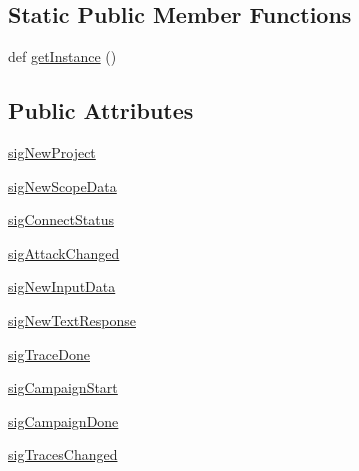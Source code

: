 \subsection*{Static Public Member Functions}
\begin{DoxyCompactItemize}
\item 
def \hyperlink{classsoftware_1_1chipwhisperer_1_1common_1_1api_1_1CWCoreAPI_1_1CWCoreAPI_a8c94db3b690e65d9c4381faac9d731c6}{get\+Instance} ()
\end{DoxyCompactItemize}
\subsection*{Public Attributes}
\begin{DoxyCompactItemize}
\item 
\hyperlink{classsoftware_1_1chipwhisperer_1_1common_1_1api_1_1CWCoreAPI_1_1CWCoreAPI_a1c9557dcedfae3f2a571ef591f2a78fd}{sig\+New\+Project}
\item 
\hyperlink{classsoftware_1_1chipwhisperer_1_1common_1_1api_1_1CWCoreAPI_1_1CWCoreAPI_a09a5565ba4eb46adf918062307354e18}{sig\+New\+Scope\+Data}
\item 
\hyperlink{classsoftware_1_1chipwhisperer_1_1common_1_1api_1_1CWCoreAPI_1_1CWCoreAPI_ae0f0bf7c249dd5c884086c8322138fed}{sig\+Connect\+Status}
\item 
\hyperlink{classsoftware_1_1chipwhisperer_1_1common_1_1api_1_1CWCoreAPI_1_1CWCoreAPI_a660a361b82022668717b12179595964b}{sig\+Attack\+Changed}
\item 
\hyperlink{classsoftware_1_1chipwhisperer_1_1common_1_1api_1_1CWCoreAPI_1_1CWCoreAPI_a09e3aae966f5cca1dfb1fae76ab70ab4}{sig\+New\+Input\+Data}
\item 
\hyperlink{classsoftware_1_1chipwhisperer_1_1common_1_1api_1_1CWCoreAPI_1_1CWCoreAPI_a7dea3f989828d21d24b96374b440b150}{sig\+New\+Text\+Response}
\item 
\hyperlink{classsoftware_1_1chipwhisperer_1_1common_1_1api_1_1CWCoreAPI_1_1CWCoreAPI_a1db00ed20dbb45fdddcf88ffeef005bf}{sig\+Trace\+Done}
\item 
\hyperlink{classsoftware_1_1chipwhisperer_1_1common_1_1api_1_1CWCoreAPI_1_1CWCoreAPI_a5af7ed7a7dcf1864af80468b4c969ba7}{sig\+Campaign\+Start}
\item 
\hyperlink{classsoftware_1_1chipwhisperer_1_1common_1_1api_1_1CWCoreAPI_1_1CWCoreAPI_a6bf096aa0c678a683dde24dbd07b152b}{sig\+Campaign\+Done}
\item 
\hyperlink{classsoftware_1_1chipwhisperer_1_1common_1_1api_1_1CWCoreAPI_1_1CWCoreAPI_ab65a9a20d482107445b9e92ca855e8ac}{sig\+Traces\+Changed}

\end{DoxyCompactItemize}
